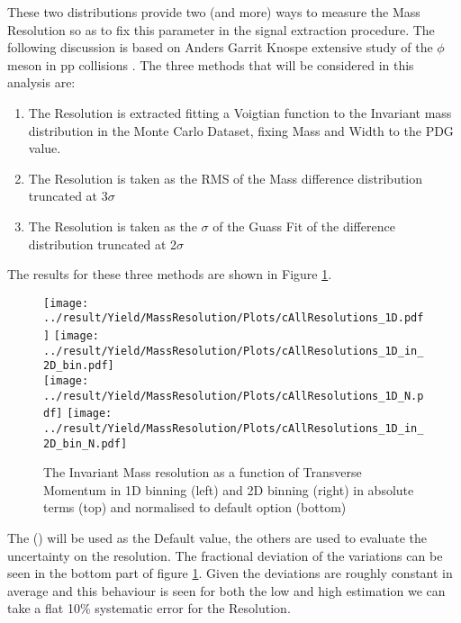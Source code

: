 \indent These two distributions provide two (and more) ways to measure the Mass Resolution so as to fix this parameter in the signal extraction procedure. The following discussion is based on Anders Garrit Knospe extensive study of the $\phi$ meson in pp collisions \cite{Anders}. The three methods that will be considered in this analysis are:
\begin{enumerate}
\item[\texttt{\color{blue}{$\sigma_{h}$}}] The Resolution is extracted fitting a Voigtian function to the Invariant mass distribution in the Monte Carlo Dataset, fixing Mass and Width to the PDG value.
\item[\texttt{\color{blue}{$\sigma_{c}$}}] The Resolution is taken as the RMS of the Mass difference distribution truncated at 3$\sigma$
\item[\texttt{\color{blue}{$\sigma_{l}$}}] The Resolution is taken as the $\sigma$ of the Guass Fit of the difference distribution truncated at 2$\sigma$
\end{enumerate}
The results for these three methods are shown in Figure \ref{fig:MassRes}.
\begin{figure}[!h]
\centering
\texttt{[image: ../result/Yield/MassResolution/Plots/cAllResolutions\_1D.pdf]}
\texttt{[image: ../result/Yield/MassResolution/Plots/cAllResolutions\_1D\_in\_2D\_bin.pdf]}\\
\texttt{[image: ../result/Yield/MassResolution/Plots/cAllResolutions\_1D\_N.pdf]}
\texttt{[image: ../result/Yield/MassResolution/Plots/cAllResolutions\_1D\_in\_2D\_bin\_N.pdf]}
\caption{The Invariant Mass resolution as a function of Transverse Momentum in 1D binning (left) and 2D binning (right) in absolute terms (top) and normalised to default option (bottom) \texttt{} }
\label{fig:MassRes}
\end{figure}
The (\texttt{}) will be used as the Default value, the others are used to evaluate the uncertainty on the resolution. The fractional deviation of the variations can be seen in the bottom part of figure \ref{fig:MassRes}. Given the deviations are roughly constant in average and this behaviour is seen for both the low and high estimation we can take a flat 10\% systematic error for the Resolution.